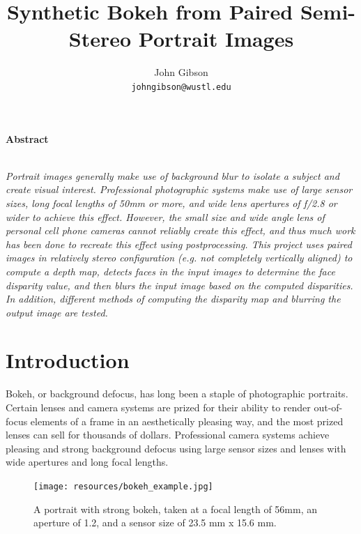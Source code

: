 \documentclass[10pt,twocolumn,letterpaper]{article}
\date{}
\title{Synthetic Bokeh from Paired Semi-Stereo Portrait Images}
\author{%
John Gibson\\
{\tt johngibson@wustl.edu}
}
\begin{document}
\maketitle

\begin{center}\textbf{Abstract}\\~\\\parbox{0.475\textwidth}{\em
    Portrait images generally make use of background blur to isolate a subject and create visual interest.
Professional photographic systems make use of large sensor sizes, long focal lengths of 50mm or more, and wide lens apertures of f/2.8 or wider
to achieve this effect. However, the small size and wide angle lens of personal cell phone cameras cannot reliably create this effect,
and thus much work has been done to recreate this effect using postprocessing. This project uses paired images in relatively stereo configuration
(e.g. not completely vertically aligned) to compute a depth map, detects faces in the input images to determine the face disparity value, and
then blurs the input image based on the computed disparities. In addition, different methods of computing the disparity map and blurring the
output image are tested.

}\end{center}

\section{Introduction}

\par Bokeh, or background defocus, has long been a staple of photographic portraits. Certain lenses and camera systems are prized for their ability
to render out-of-focus elements of a frame in an aesthetically pleasing way, and the most prized lenses can sell for thousands of dollars. Professional
camera systems achieve pleasing and strong background defocus using large sensor sizes and lenses with wide apertures and long focal lengths.

\begin{figure}[!t]
    \begin{center}
        \texttt{[image: resources/bokeh\_example.jpg]} %
    \end{center}
    \caption{A portrait with strong bokeh, taken at a focal length of 56mm, an aperture of 1.2, and a sensor size of 23.5 mm x 15.6 mm.}
    \label{fig:bokehexample}
\end{figure}
\end{document}
